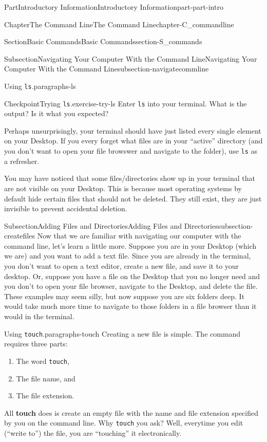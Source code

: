 \documentclass[oneside,10pt,]{book}
\newcommand{\mono}[1]{\texttt{#1}}
\newcommand{\terminology}[1]{\textbf{#1}}
\begin{document}
\begin{partptx}{Part}{Introductory Information}{}{Introductory Information}{}{}{part-part-intro}
\begin{chapterptx}{Chapter}{The Command Line}{}{The Command Line}{}{}{chapter-C_commandline}
\begin{sectionptx}{Section}{Basic Commands}{}{Basic Commands}{}{}{section-S_commands}
\begin{subsectionptx}{Subsection}{Navigating Your Computer With the Command Line}{}{Navigating Your Computer With the Command Line}{}{}{subsection-navigatecommline}
\begin{paragraphs}{Using \mono{ls}.}{paragraphs-ls}
\begin{inlineexercise}{Checkpoint}{Trying \mono{ls}.}{exercise-try-ls}%
Enter \mono{ls} into your terminal. What is the output? Is it what you expected?%
\end{inlineexercise}%
Perhaps unsurprisingly, your terminal should have just listed every single element on your Desktop. If you every forget what files are in your ``active'' directory (and you don't want to open your file browswer and navigate to the folder), use \mono{ls} as a refresher.%
\par
You may have noticed that some files\slash{}directories show up in your terminal that are not visible on your Desktop. This is because most operating systems by default hide certain files that should not be deleted. They still exist, they are just invisible to prevent accidental deletion.%
\end{paragraphs}%
\end{subsectionptx}
%
%
\typeout{************************************************}
\typeout{************************************************}
%
\begin{subsectionptx}{Subsection}{Adding Files and Directories}{}{Adding Files and Directories}{}{}{subsection-createfiles}
%
Now that we are familiar with navigating our computer with the command line, let's learn a little more. Suppose you are in your Desktop (which we are) and you want to add a text file. Since you are already in the terminal, you don't want to open a text editor, create a new file, and save it to your desktop. Or, suppose you have a file on the Desktop that you no longer need and you don't to open your file browser, navigate to the Desktop, and delete the file. These examples may seem silly, but now suppose you are six folders deep. It would take much more time to navigate to those folders in a file browser than it would in the terminal.%
\begin{paragraphs}{Using \mono{touch}.}{paragraphs-touch}%
\index{\mono{touch}}%
\index{command line!\mono{touch}}%
Creating a new file is simple. The command requires three parts:%
\begin{enumerate}
\item{}The word \mono{touch},%
\item{}The file name, and%
\item{}The file extension.%
\end{enumerate}
All \terminology{touch} does is create an empty file with the name and file extension specified by you on the command line. Why \mono{touch} you ask? Well, everytime you edit (``write to'') the file, you are ``touching'' it electronically.%

\end{paragraphs}
\end{subsectionptx}
\end{sectionptx}
\end{chapterptx}
\end{partptx}
\end{document}
